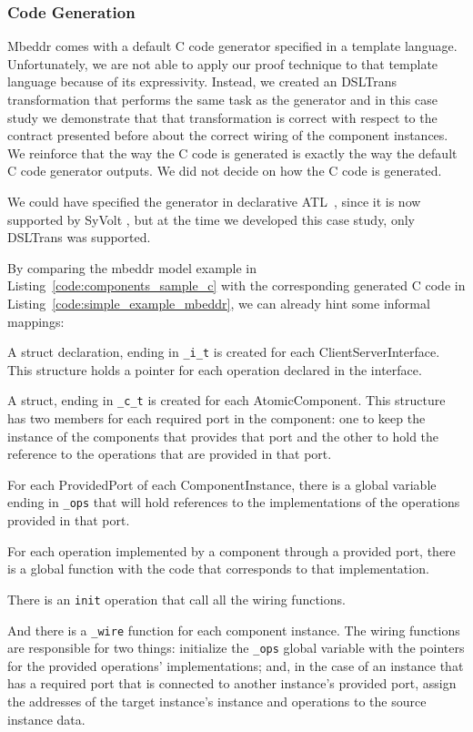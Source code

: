 \subsubsection{Code Generation}

Mbeddr comes with a default C code generator specified in a template language. Unfortunately, we are not able to apply our proof technique to that template language because of its expressivity. Instead, we created an DSLTrans transformation that performs the same task as the generator and in this case study we demonstrate that that transformation is correct with respect to the contract presented before about the correct wiring of the component instances.
We reinforce that the way the C code is generated is exactly the way the default C code generator outputs. We did not decide on how the C code is generated.

We could have specified the generator in declarative ATL~\cite{Jouault2006a}, since it is now supported by SyVolt \cite{Oakes}, but at the time we developed this case study, only DSLTrans was supported.

By comparing the mbeddr model example in Listing~\ref{code:components_sample_c} with the corresponding generated C code in Listing~\ref{code:simple_example_mbeddr}, we can already hint some informal mappings:
\begin{compactitem}
\item A struct declaration, ending in \verb=_i_t= is created for each ClientServerInterface. This structure holds a pointer for each operation declared in the interface.
\item A struct, ending in \verb=_c_t= is created for each AtomicComponent. This structure has two members for each required port in the component: one to keep the instance of the components that provides that port and the other to hold the reference to the operations that are provided in that port.
\item For each ProvidedPort of each ComponentInstance, there is a global variable ending in \verb=_ops= that will hold references to the implementations of the operations provided in that port.
\item For each operation implemented by a component through a provided port, there is a global function with the code that corresponds to that implementation.
\item There is an \verb=init= operation that call all the wiring functions.
\item And there is a \verb=_wire= function for each component instance. The wiring functions are responsible for two things: initialize the \verb=_ops= global variable with the pointers for the provided operations' implementations; and, in the case of an instance that has a required port that is connected to another instance's provided port, assign the addresses of the target instance's instance and operations to the source instance data.
\end{compactitem}

